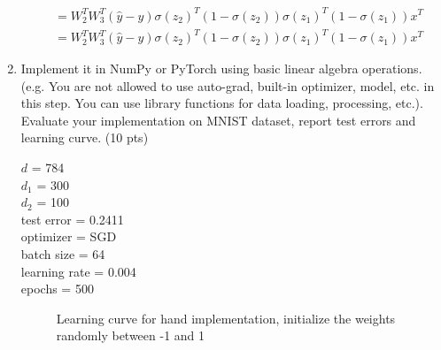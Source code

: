 \documentclass[10pt]{article}
\theoremstyle{definition}
\newenvironment{soln}{
    \leavevmode\color{blue}\ignorespaces
}{}
\begin{document}
\begin{enumerate}
\begin{soln}
\begin{align*}
                                                  & = W_2 ^ T  W_3 ^ T (\hat{y} - y)  \sigma(z_2) ^ T (1 - \sigma(z_2)) \sigma(z_1) ^ T (1 - \sigma(z_1)) x ^ T                                                     \\
                                                  & = W_2 ^ T  W_3 ^ T (\hat{y} - y)  \sigma(z_2) ^ T (1 - \sigma(z_2)) \sigma(z_1) ^ T (1 - \sigma(z_1)) x ^ T
              \end{align*}
          \end{soln}
    \item Implement it in NumPy or PyTorch using basic linear algebra operations. (e.g. You are not allowed to use auto-grad, built-in optimizer, model, etc. in this step. You can use library functions for data loading, processing, etc.). Evaluate your implementation on MNIST dataset, report test errors and learning curve. (10 pts) \\
          \begin{soln}
              $d$ = 784 \\
              $d_1$ = 300 \\
              $d_2$ = 100 \\
              test error = 0.2411 \\
              optimizer = SGD \\
              batch size = 64 \\
              learning rate = 0.004 \\
              epochs = 500 \\
              \begin{figure}[H]
                \centering  %
                \caption{Learning curve for hand implementation, initialize the weights randomly between -1 and 1}
                \label{Fig1.main}

\end{figure}
\end{soln}
\end{enumerate}
\end{document}
